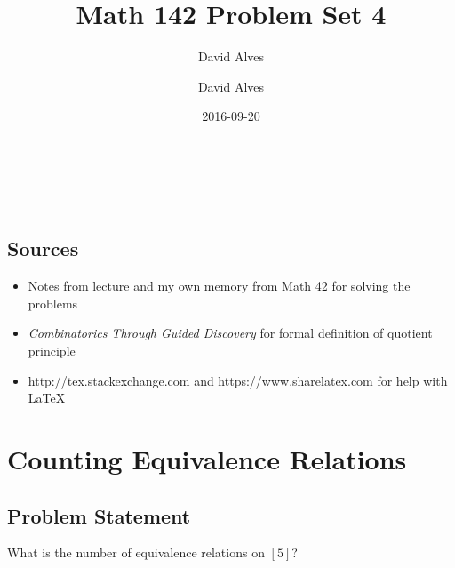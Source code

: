 \documentclass[12pt]{article}
\author{David Alves}
\title{Math 142 Problem Set 4}
\author{David Alves}
\date{2016-09-20}
\begin{document}

\begin{center}
\Large \thetitle \\
\large \theauthor \\
\thedate
\end{center}

\subsection*{Sources}

    \begin{itemize}
    \item Notes from lecture and my own memory from Math 42 for solving the problems
    \item \textit{Combinatorics Through Guided Discovery} for formal definition of quotient principle
    \item http://tex.stackexchange.com and https://www.sharelatex.com for help with \LaTeX
    \end{itemize}

\section{Counting Equivalence Relations}
\subsection*{Problem Statement}
What is the number of equivalence relations on $[5]$?
\end{document}
